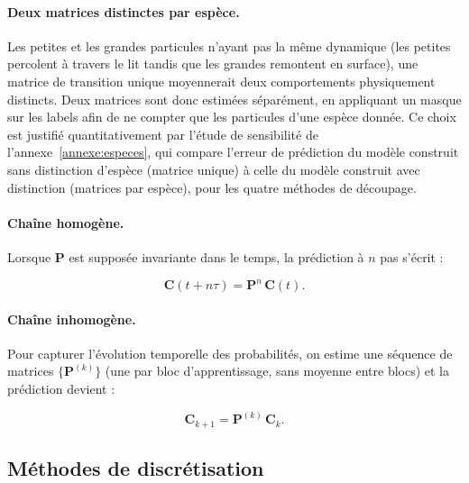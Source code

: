 \documentclass[french]{MemoireMaster}
\begin{document}
\paragraph{Deux matrices distinctes par espèce.} Les petites et les grandes particules n'ayant pas la même dynamique (les petites percolent à travers le lit tandis que les grandes remontent en surface), une matrice de transition unique moyennerait deux comportements physiquement distincts. Deux matrices sont donc estimées séparément, en appliquant un masque sur les labels afin de ne compter que les particules d'une espèce donnée. Ce choix est justifié quantitativement par l'étude de sensibilité de l'annexe~\ref{annexe:especes}, qui compare l'erreur de prédiction du modèle construit sans distinction d'espèce (matrice unique) à celle du modèle construit avec distinction (matrices par espèce), pour les quatre méthodes de découpage.

\paragraph{Chaîne homogène.} Lorsque $\mathbf{P}$ est supposée invariante dans le temps, la prédiction à $n$ pas s'écrit :

\begin{equation}
  \mathbf{C}(t+n\tau)
  =
  \mathbf{P}^n \, \mathbf{C}(t).
  \label{eq:prediction_homogene}
\end{equation}

\paragraph{Chaîne inhomogène.} Pour capturer l'évolution temporelle des probabilités, on estime une séquence de matrices $\{\mathbf{P}^{(k)}\}$ (une par bloc d'apprentissage, sans moyenne entre blocs) et la prédiction devient :

\begin{equation}
  \mathbf{C}_{k+1}
  =
  \mathbf{P}^{(k)} \, \mathbf{C}_k.
  \label{eq:prediction_inhomogene}
\end{equation}



\subsection{Méthodes de discrétisation}
\label{subsec:discretisation}
\end{document}
